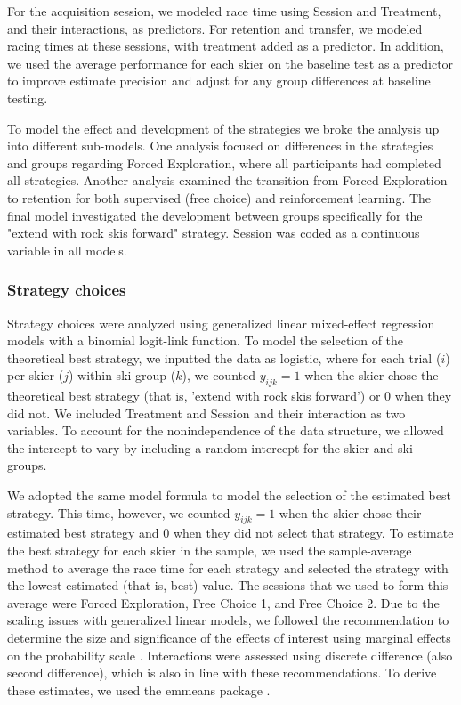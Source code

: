 \documentclass[pdflatex,sn-nature]{sn-jnl}%
\theoremstyle{thmstyleone}%
\theoremstyle{thmstyletwo}%
\theoremstyle{thmstylethree}%
\begin{document}
For the acquisition session, we modeled race time using Session and Treatment, and their interactions, as predictors. For retention and transfer, we modeled racing times at these sessions, with treatment added as a predictor. In addition, we used the average performance for each skier on the baseline test as a predictor to improve estimate precision and adjust for any group differences at baseline testing. 

To model the effect and development of the strategies we broke the analysis up into different sub-models. One analysis focused on differences in the strategies and groups regarding Forced Exploration, where all participants had completed all strategies. Another analysis examined the transition from Forced Exploration to retention for both supervised (free choice) and reinforcement learning. The final model investigated the development between groups specifically for the "extend with rock skis forward" strategy. Session was coded as a continuous variable in all models. 

\subsubsection{Strategy choices}
Strategy choices were analyzed using generalized linear mixed-effect regression models with a binomial logit-link function. To model the selection of the theoretical best strategy, we inputted the data as logistic, where for each trial (\(i\)) per skier (\(j\)) within ski group (\(k\)), we counted \(y_{ijk}=1\) when the skier chose the theoretical best strategy (that is, 'extend with rock skis forward') or 0 when they did not. We included Treatment and Session and their interaction as two variables. To account for the nonindependence of the data structure, we allowed the intercept to vary by including a random intercept for the skier and ski groups.

We adopted the same model formula to model the selection of the estimated best strategy. This time, however, we counted \(y_{ijk}=1\) when the skier chose their estimated best strategy and 0 when they did not select that strategy. To estimate the best strategy for each skier in the sample, we used the sample-average method \cite{sutton_reinforcement_2018} to average the race time for each strategy and selected the strategy with the lowest estimated (that is, best) value. The sessions that we used to form this average were Forced Exploration, Free Choice 1, and Free Choice 2.  Due to the scaling issues with generalized linear models, we followed the recommendation to determine the size and significance of the effects of interest using marginal effects on the probability scale \cite{mize_best_2019, mccabe_interpreting_2022}. Interactions were assessed using discrete difference (also second difference), which is also in line with these recommendations. To derive these estimates, we used the emmeans package \cite{lenth_emmeans_2023}.
\end{document}
